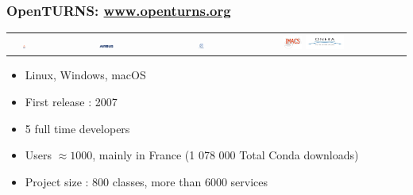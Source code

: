 \documentclass{beamer}
\begin{document}
\begin{frame}
\frametitle{OpenTURNS: \url{www.openturns.org}}

\begin{center}
   \begin{tabular}{ccccc}
   \includegraphics[width=0.10\textwidth]{figures/logoEDF_Anne.png}&
   \includegraphics[width=0.12\textwidth]{figures/LogoAirbus.png}&
   \includegraphics[width=0.12\textwidth]{figures/logo_phimeca.png}&
   \includegraphics[width=0.12\textwidth]{figures/logo_Imacs.png}
   \includegraphics[width=0.25\textwidth]{figures/logo_ONERA.jpg}&
   \end{tabular}
\end{center}

\vspace*{0.05cm}
\begin{itemize}
\item Linux, Windows, macOS
\item First release : 2007
\item 5 full time developers
\item Users $\approx 1000$, mainly in France
(1 078 000 Total Conda downloads)
\item Project size : 800  classes, more than 6000 services
\end{itemize}


\end{frame}

\end{document}
